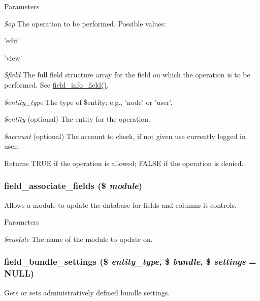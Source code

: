 \begin{DoxyParams}{Parameters}
\item[{\em \$op}]The operation to be performed. Possible values:
\begin{DoxyItemize}
\item 'edit'
\item 'view' 
\end{DoxyItemize}\item[{\em \$field}]The full field structure array for the field on which the operation is to be performed. See \hyperlink{group__field__info_ga74cfc942cd2baa5c49780b08c5d357d4}{field\_\-info\_\-field()}. \item[{\em \$entity\_\-type}]The type of \$entity; e.g., 'node' or 'user'. \item[{\em \$entity}](optional) The entity for the operation. \item[{\em \$account}](optional) The account to check, if not given use currently logged in user.\end{DoxyParams}
\begin{DoxyReturn}{Returns}
TRUE if the operation is allowed; FALSE if the operation is denied. 
\end{DoxyReturn}
\hypertarget{group__field_gaf3444a608af81b62af5be3dbc72a7d7d}{
\subsubsection[{field\_\-associate\_\-fields}]{\setlength{\rightskip}{0pt plus 5cm}field\_\-associate\_\-fields (\$ {\em module})}}
\label{group__field_gaf3444a608af81b62af5be3dbc72a7d7d}
Allows a module to update the database for fields and columns it controls.


\begin{DoxyParams}{Parameters}
\item[{\em \$module}]The name of the module to update on. \end{DoxyParams}
\hypertarget{group__field_gab6416216c1491d34f1bdc7ce38abfe8c}{
\subsubsection[{field\_\-bundle\_\-settings}]{\setlength{\rightskip}{0pt plus 5cm}field\_\-bundle\_\-settings (\$ {\em entity\_\-type}, \/  \$ {\em bundle}, \/  \$ {\em settings} = {\ttfamily NULL})}}
\label{group__field_gab6416216c1491d34f1bdc7ce38abfe8c}
Gets or sets administratively defined bundle settings.


